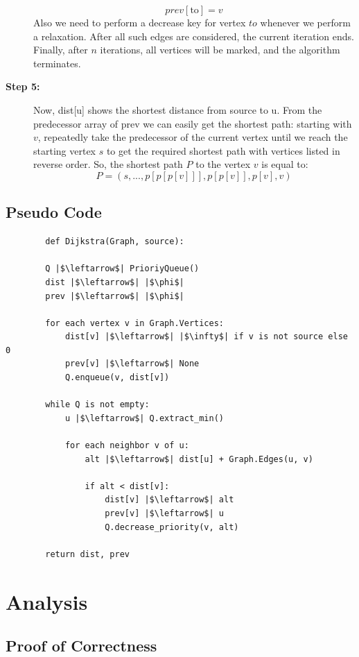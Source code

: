 \documentclass[12pt, a4paper]{article}
\begin{document}
\begin{description}
        $$prev[\text{to}] = v$$
        Also we need to perform a decrease key for vertex $to$ whenever we perform a relaxation. After all such edges are considered, the current iteration ends. Finally, after $n$ iterations, all vertices will be marked, and the algorithm terminates.
        \item[\textbf{Step 5: }] Now, dist[u] shows the shortest distance from source to u. From the predecessor array of prev we can easily get the shortest path: starting with $v$, repeatedly take the predecessor of the current vertex until we reach the starting vertex $s$ to get the required shortest path with vertices listed in reverse order. So, the shortest path $P$ to the vertex $v$ is equal to: 
        $$P = (s,...,p[p[p[v]]], p[p[v]], p[v], v)$$
    \end{description}
    \pagebreak
    \subsection{Pseudo Code}
    \begin{verbatim}
        def Dijkstra(Graph, source):

        Q |$\leftarrow$| PrioriyQueue()
        dist |$\leftarrow$| |$\phi$|
        prev |$\leftarrow$| |$\phi$|

        for each vertex v in Graph.Vertices:
            dist[v] |$\leftarrow$| |$\infty$| if v is not source else 0
            prev[v] |$\leftarrow$| None
            Q.enqueue(v, dist[v])

        while Q is not empty:
            u |$\leftarrow$| Q.extract_min()

            for each neighbor v of u:
                alt |$\leftarrow$| dist[u] + Graph.Edges(u, v)
            
                if alt < dist[v]:
                    dist[v] |$\leftarrow$| alt
                    prev[v] |$\leftarrow$| u
                    Q.decrease_priority(v, alt)
                
        return dist, prev
    \end{verbatim}
    \pagebreak
    \section{Analysis}
\subsection{Proof of Correctness}
\end{document}
